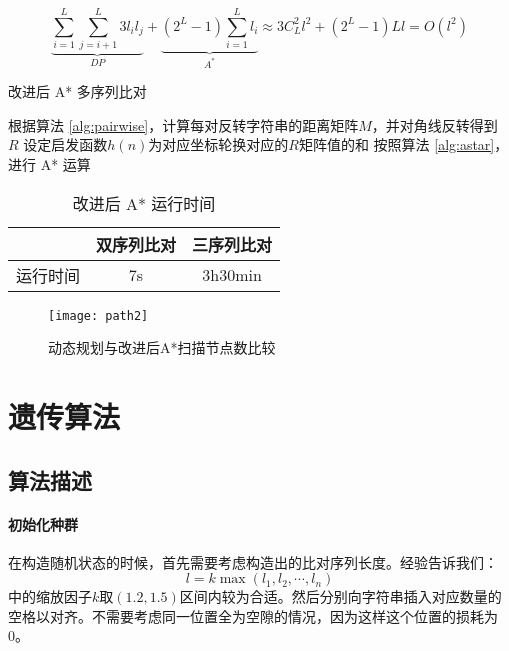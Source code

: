     \begin{equation}
        \underbrace{\sum_{i=1}^L\sum_{j=i+1}^L 3l_il_j}_{DP} + \underbrace{(2^L-1)\sum_{i=1}^L l_i}_{A^*} \approx 3C_{L}^2 l^2 + (2^L-1)Ll = O(l^2)
    \end{equation}

    \begin{algorithm}[h]
        \caption{改进后 A* 多序列比对}\label{alg:hastar}
        根据算法 \ref{alg:pairwise}，计算每对反转字符串的距离矩阵$M$，并对角线反转得到 $R$\;
        设定启发函数$h(n)$为对应坐标轮换对应的$R$矩阵值的和\;
        按照算法 \ref{alg:astar}，进行 A* 运算\;
    \end{algorithm}

    \begin{minipage}{0.5\textwidth}
        \begin{table}[H]
            \centering
            \caption{改进后 A* 运行时间}\label{tab:astar}
            \begin{tabular}{ccc}
                \toprule
                 & 双序列比对 & 三序列比对 \\
                \midrule
                运行时间 & 7s & 3h30min \\
                \bottomrule
            \end{tabular}
        \end{table}
    \end{minipage}
    \begin{minipage}{0.5\textwidth}
        \begin{figure}[H]
            \centering
            \texttt{[image: path2]}
            \caption{动态规划与改进后A*扫描节点数比较}\label{fig:path2}
        \end{figure}
    \end{minipage}

    \section{遗传算法}

    \subsection{算法描述}
    

    \paragraph{初始化种群} 在构造随机状态的时候，首先需要考虑构造出的比对序列长度。经验\cite{simplega}告诉我们：
    \begin{equation*}
         l = k\max{(l_1,l_2,\cdots,l_n)}
    \end{equation*}
    中的缩放因子$k$取$(1.2,1.5)$区间内较为合适。然后分别向字符串插入对应数量的空格以对齐。不需要考虑同一位置全为空隙的情况，因为这样这个位置的损耗为 0。

